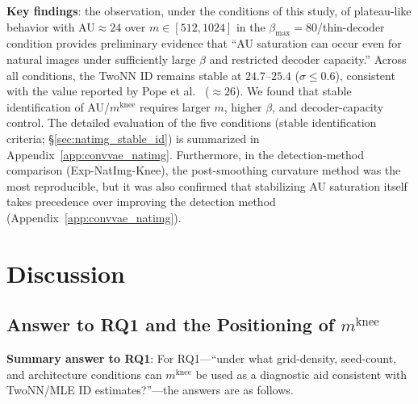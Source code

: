 \documentclass[make,article,submit,pdftex,moreauthors]{Definitions/mdpi}
\newcommand{\mknee}{m^{\mathrm{knee}}}
\begin{document}
\textbf{Key findings}:
the observation, under the conditions of this study, of plateau-like behavior
with AU$\approx 24$ over $m \in [512, 1024]$ in the
$\beta_{\max}=80$/thin-decoder condition provides preliminary evidence that
``AU saturation can occur even for natural images under sufficiently large
$\beta$ and restricted decoder capacity.''
Across all conditions, the TwoNN ID remains stable at $24.7$--$25.4$
($\sigma \leq 0.6$), consistent with the value reported by Pope et
al.~\cite{pope2021intrinsic} ($\approx 26$).
We found that stable identification of AU/$\mknee$ requires larger $m$, higher
$\beta$, and decoder-capacity control. The detailed evaluation of the five
conditions (stable identification criteria; \S\ref{sec:natimg_stable_id}) is
summarized in Appendix~\ref{app:convvae_natimg}.
Furthermore, in the detection-method comparison (Exp-NatImg-Knee), the
post-smoothing curvature method was the most reproducible, but it was also
confirmed that stabilizing AU saturation itself takes precedence over
improving the detection method (Appendix~\ref{app:convvae_natimg}).

\section{Discussion}\label{sec:discussion}

\subsection{Answer to RQ1 and the Positioning of $\mknee$}\label{sec:disc_mknee}

\textbf{Summary answer to RQ1}: For RQ1---``under what grid-density, seed-count,
and architecture conditions can $\mknee$ be used as a diagnostic aid consistent
with TwoNN/MLE ID estimates?''---the answers are as follows.
\end{document}
